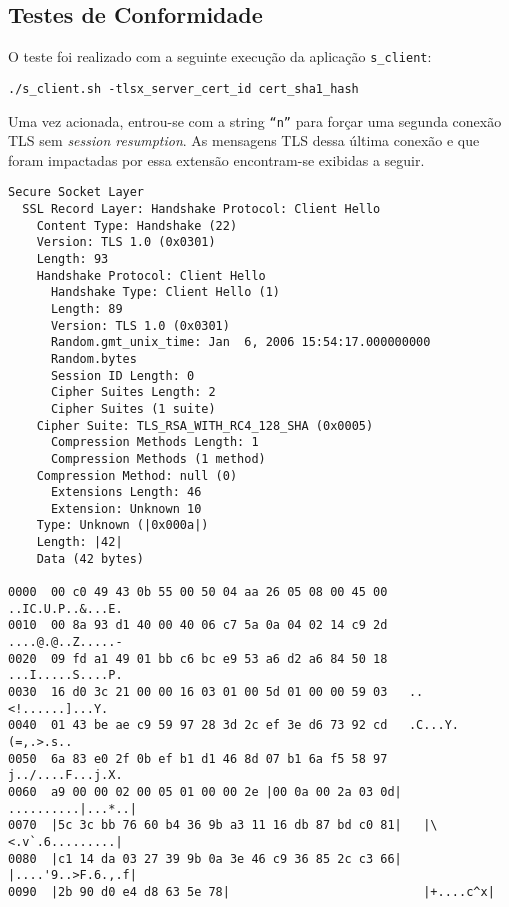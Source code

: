\subsection{Testes de Conformidade}

O teste foi realizado com a seguinte execução da aplicação \verb|s_client|:

\begin{lstlisting}[caption={Chamada da \texttt{s\_client.sh} para o teste da extensão \acs{SCCI}}]
./s_client.sh -tlsx_server_cert_id cert_sha1_hash
\end{lstlisting}

Uma vez acionada, entrou-se com a string \texttt{``n''} para forçar uma segunda 
conexão TLS sem \emph{session resumption}. As mensagens TLS dessa última conexão e 
que foram impactadas por essa extensão encontram-se exibidas a seguir.

\begin{lstlisting}[caption={Mensagem \tlsHsCh com a extensão \acs{SCCI}}]
Secure Socket Layer 
  SSL Record Layer: Handshake Protocol: Client Hello 
    Content Type: Handshake (22) 
    Version: TLS 1.0 (0x0301) 
    Length: 93 
    Handshake Protocol: Client Hello 
      Handshake Type: Client Hello (1) 
      Length: 89 
      Version: TLS 1.0 (0x0301) 
      Random.gmt_unix_time: Jan  6, 2006 15:54:17.000000000 
      Random.bytes 
      Session ID Length: 0 
      Cipher Suites Length: 2 
      Cipher Suites (1 suite) 
	Cipher Suite: TLS_RSA_WITH_RC4_128_SHA (0x0005) 
      Compression Methods Length: 1 
      Compression Methods (1 method) 
	Compression Method: null (0) 
      Extensions Length: 46 
      Extension: Unknown 10 
	Type: Unknown (|0x000a|) 
	Length: |42| 
	Data (42 bytes) 
 
0000  00 c0 49 43 0b 55 00 50 04 aa 26 05 08 00 45 00   ..IC.U.P..&...E. 
0010  00 8a 93 d1 40 00 40 06 c7 5a 0a 04 02 14 c9 2d   ....@.@..Z.....- 
0020  09 fd a1 49 01 bb c6 bc e9 53 a6 d2 a6 84 50 18   ...I.....S....P. 
0030  16 d0 3c 21 00 00 16 03 01 00 5d 01 00 00 59 03   ..<!......]...Y. 
0040  01 43 be ae c9 59 97 28 3d 2c ef 3e d6 73 92 cd   .C...Y.(=,.>.s.. 
0050  6a 83 e0 2f 0b ef b1 d1 46 8d 07 b1 6a f5 58 97   j../....F...j.X. 
0060  a9 00 00 02 00 05 01 00 00 2e |00 0a 00 2a 03 0d|   ..........|...*..| 
0070  |5c 3c bb 76 60 b4 36 9b a3 11 16 db 87 bd c0 81|   |\<.v`.6.........| 
0080  |c1 14 da 03 27 39 9b 0a 3e 46 c9 36 85 2c c3 66|   |....'9..>F.6.,.f| 
0090  |2b 90 d0 e4 d8 63 5e 78|                           |+....c^x|
\end{lstlisting}

